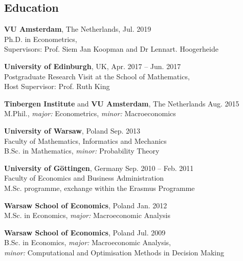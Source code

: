 \documentclass[margin,line]{resume}
\begin{document}
\begin{resume}
    \section{\mysidestyle Education}
    \textbf{VU Amsterdam},  The Netherlands, \hfill Jul. 2019\\
	Ph.D. in Econometrics,\\ 
    Supervisors: Prof. Siem Jan Koopman and Dr Lennart. Hoogerheide

\vspace{-1mm}

    \textbf{University of Edinburgh},  UK, \hfill Apr. 2017 -- Jun. 2017\\
	Postgraduate Research Visit at the School of Mathematics,\\ 
    Host Supervisor: Prof. Ruth King

\vspace{-1mm}

    \textbf{Tinbergen Institute} and \textbf{VU Amsterdam}, The Netherlands  \hfill Aug. 2015 	\\
	M.Phil., \textit{major:} Econometrics, \textit{minor:} Macroeconomics 

\vspace{-1mm}

	\textbf{University of Warsaw}, Poland  \hfill Sep. 2013 	
	\vspace{1mm}\\
	Faculty of Mathematics, Informatics and Mechanics \\B.Sc. in Mathematics, \textit{minor:} Probability Theory 
    
\vspace{-1mm}

	\textbf{University of G{\"o}ttingen}, Germany   \hfill Sep. 2010 -- Feb. 2011	\\
    Faculty of Economics and Business Administration \\M.Sc. programme, exchange within the Erasmus Programme

\vspace{-1mm}

	\textbf{Warsaw School of Economics}, Poland   \hfill  Jan. 2012\\
	M.Sc. in Economics, \textit{major:} Macroeconomic Analysis

\vspace{-1mm}

 	\textbf{Warsaw School of Economics}, Poland  \hfill  Jul. 2009\\
   	B.Sc. in Economics, \textit{major:} Macroeconomic Analysis,\\ 
    \textit{minor:} Computational and Optimisation Methods in Decision Making\\
    

\end{resume}
\end{document}
